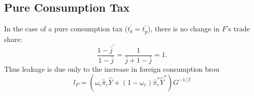 \documentclass[notitlepage,12pt]{article}
\begin{document}
\subsection{Pure Consumption Tax}

In the case of a pure consumption tax ($t_{b}^{\prime }=t_{p}^{\prime }$),
there is no change in $F$'s trade share:%
\begin{equation*}
\frac{1-\bar{j}^{\prime }}{1-\bar{j}}=\frac{1}{\bar{j}+1-\bar{j}}=1.
\end{equation*}%
Thus leakage is due only to the increase in foreign consumption brou%
\begin{equation*}
l_{P}=\left( \omega _{c}\hat{\pi}_{c}\hat{Y}+\left( 1-\omega _{c}\right) 
\hat{\pi}_{c}^{\ast }\hat{Y}^{\ast }\right) G^{-1/\beta }
\end{equation*}
\end{document}
